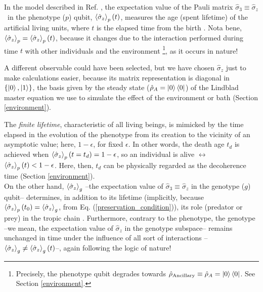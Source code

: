 \documentclass[11pt]{article}
\numberwithin{equation}{section} %
\numberwithin{figure}{section} %
\begin{document}
In the model described in Ref. \cite{QAL_IBM}, the expectation value of the Pauli matrix $\hat{\sigma}_3\equiv\hat{\sigma}_z$ $\,$ \cite[p.~169, Eq.~(3.2.32c)]{Sakurai} in the phenotype ($p$) qubit, $\braket{\hat{\sigma}_z}_p(t)$, measures the age (spent lifetime) of the artificial living units, where $t$ is the elapsed time from the birth \cite[p.~3, l.~10]{AL_in_QT}. Nota bene, $\braket{\hat{\sigma}_z}_p=\braket{\hat{\sigma}_z}_p(t)$, because it changes \cite[p.~2, l.~13-14]{QAL_IBM} due to the interaction performed during time $t$ with other individuals and the environment \footnote{Precisely, the phenotype qubit degrades towards $\hat{\rho}_{\textrm{Ancillary}}\equiv\hat{\rho}_A=\ket{0}\bra{0}$. See Section \ref{environment}.}, as it occurs in nature!

A different observable could have been selected, but we have chosen $\hat{\sigma}_z$ just to make calculations easier, because its matrix representation is diagonal in $\{\ket{0},\ket{1}\}$, the basis given by the steady state ($\hat{\rho}_A=\ket{0}\bra{0}$) of the Lindblad master equation we use to simulate the effect of the environment or bath (Section \ref{environment}).

The \emph{finite lifetime}, characteristic of all living beings, is mimicked by the time elapsed in the evolution of the phenotype from its creation to the vicinity of an asymptotic value; here, $1-\epsilon$, for fixed $\epsilon$. In other words, \cite[p.~3, l.~11-12]{AL_in_QT} the death age $t_d$ is achieved when $\braket{\hat{\sigma}_z}_p(t=t_d)=1-\epsilon$, so an individual is alive $\leftrightarrow$ $\braket{\hat{\sigma}_z}_p(t)<1-\epsilon$. Here, then, $t_d$ can be physically regarded as the decoherence time (Section \ref{environment}). \\

On the other hand, $\braket{\hat{\sigma}_z}_g$ --the expectation value of $\hat{\sigma}_3\equiv\hat{\sigma}_z$ in the genotype ($g$) qubit-- determines, in addition to its lifetime (implicitly, because $\braket{\hat{\sigma}_z}_p(t_0)=\braket{\hat{\sigma}_z}_g$, from Eq. (\ref{preservation_condition})), its role (predator or prey) in the tropic chain \cite[p.~1, l.~39]{AL_in_QT}. Furthermore, contrary to the phenotype, the genotype --we mean, the expectation value of $\hat{\sigma}_z$ in the genotype subspace-- remains unchanged in time under the influence of all sort of interactions --$\braket{\hat{\sigma}_z}_g\neq\braket{\hat{\sigma}_z}_g(t)$--, again following the logic of nature!
\end{document}
